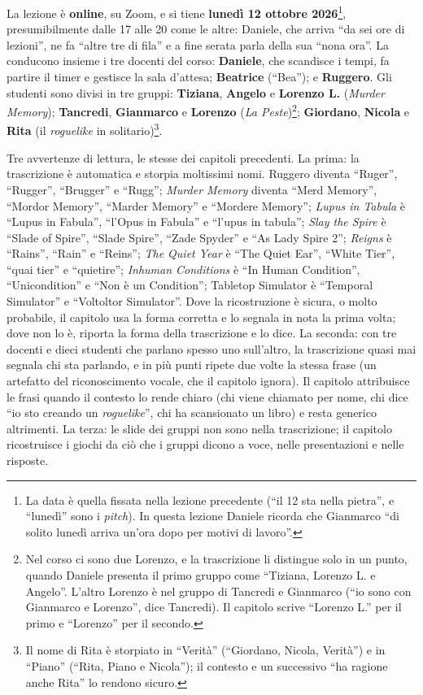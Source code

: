 La lezione è \textbf{online}, su Zoom, e si tiene \textbf{lunedì 12 ottobre
2026}\footnote{La data è quella fissata nella lezione precedente (``il 12 sta nella
pietra'', e ``lunedì'' sono i \emph{pitch}). In questa lezione Daniele ricorda che
Gianmarco ``di solito lunedì arriva un'ora dopo per motivi di lavoro''.}, presumibilmente
dalle 17 alle 20 come le altre: Daniele, che arriva ``da sei ore di lezioni'', ne fa
``altre tre di fila'' e a fine serata parla della sua ``nona ora''. La conducono insieme
i tre docenti del corso: \textbf{Daniele}, che scandisce i tempi, fa partire il timer e
gestisce la sala d'attesa; \textbf{Beatrice} (``Bea''); e \textbf{Ruggero}. Gli studenti
sono divisi in tre gruppi: \textbf{Tiziana}, \textbf{Angelo} e \textbf{Lorenzo L.}
(\emph{Murder Memory}); \textbf{Tancredi}, \textbf{Gianmarco} e \textbf{Lorenzo}
(\emph{La Peste})\footnote{Nel corso ci sono due Lorenzo, e la trascrizione li
distingue solo in un punto, quando Daniele presenta il primo gruppo come ``Tiziana,
Lorenzo L. e Angelo''. L'altro Lorenzo è nel gruppo di Tancredi e Gianmarco (``io sono
con Gianmarco e Lorenzo'', dice Tancredi). Il capitolo scrive ``Lorenzo L.'' per il
primo e ``Lorenzo'' per il secondo.}; \textbf{Giordano}, \textbf{Nicola} e
\textbf{Rita} (il \emph{roguelike} in solitario)\footnote{Il nome di Rita è storpiato in
``Verità'' (``Giordano, Nicola, Verità'') e in ``Piano'' (``Rita, Piano e Nicola''); il
contesto e un successivo ``ha ragione anche Rita'' lo rendono sicuro.}.

Tre avvertenze di lettura, le stesse dei capitoli precedenti. La prima: la trascrizione è
automatica e storpia moltissimi nomi. Ruggero diventa ``Ruger'', ``Rugger'',
``Brugger'' e ``Rugg''; \emph{Murder Memory} diventa ``Merd Memory'', ``Mordor
Memory'', ``Marder Memory'' e ``Mordere Memory''; \emph{Lupus in Tabula} è ``Lupus in
Fabula'', ``l'Opus in Fabula'' e ``l'upus in tabula''; \emph{Slay the Spire} è ``Slade
of Spire'', ``Slade Spire'', ``Zade Spyder'' e ``As Lady Spire 2''; \emph{Reigns} è
``Rains'', ``Rain'' e ``Reins''; \emph{The Quiet Year} è ``The Quiet Ear'', ``White
Tier'', ``quai tier'' e ``quietire''; \emph{Inhuman Conditions} è ``In Human
Condition'', ``Unicondition'' e ``Non è un Condition''; Tabletop Simulator è ``Temporal
Simulator'' e ``Voltoltor Simulator''. Dove la ricostruzione è sicura, o molto probabile,
il capitolo usa la forma corretta e lo segnala in nota la prima volta; dove non lo è,
riporta la forma della trascrizione e lo dice. La seconda: con tre docenti e dieci
studenti che parlano spesso uno sull'altro, la trascrizione quasi mai segnala chi sta
parlando, e in più punti ripete due volte la stessa frase (un artefatto del
riconoscimento vocale, che il capitolo ignora). Il capitolo attribuisce le frasi quando
il contesto lo rende chiaro (chi viene chiamato per nome, chi dice ``io sto creando un
\emph{roguelike}'', chi ha scansionato un libro) e resta generico altrimenti. La terza:
le slide dei gruppi non sono nella trascrizione; il capitolo ricostruisce i giochi da ciò
che i gruppi dicono a voce, nelle presentazioni e nelle risposte.

